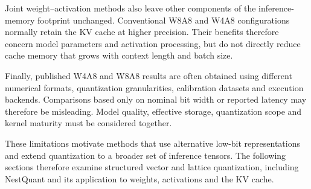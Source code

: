 Joint weight--activation methods also leave other components of the
inference-memory footprint unchanged. Conventional W8A8 and W4A8
configurations normally retain the \ac{KV} cache at higher precision.
Their benefits therefore concern model parameters and activation
processing, but do not directly reduce cache memory that grows with
context length and batch size.

Finally, published W4A8 and W8A8 results are often obtained using
different numerical formats, quantization granularities, calibration
datasets and execution backends. Comparisons based only on nominal bit
width or reported latency may therefore be misleading. Model quality,
effective storage, quantization scope and kernel maturity must be
considered together.

These limitations motivate methods that use alternative low-bit
representations and extend quantization to a broader set of inference
tensors. The following sections therefore examine structured vector and
lattice quantization, including NestQuant and its application to
weights, activations and the \ac{KV} cache.
